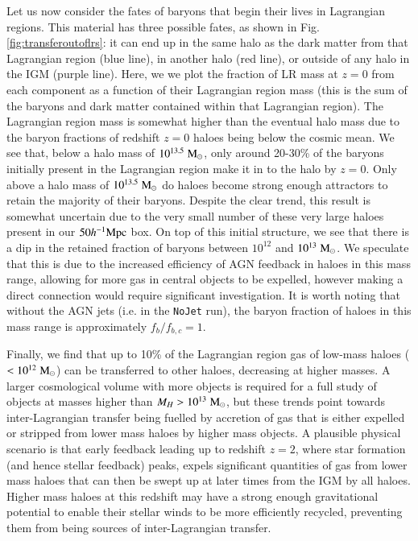 \documentclass[fleqn,usenatbib]{mnras}
\newcommand{\hmpc}{h^{-1}{\rm Mpc}}
\newcommand{\msolar}{\;{\rm M}_{\odot}}
\newcommand{\nojet}{{\tt NoJet}}
\begin{document}
Let us now consider the fates of baryons that begin their lives in Lagrangian
regions. This material has three possible fates, as shown in Fig.
\ref{fig:transferoutoflrs}: it can end up in the same halo as the dark matter
from that Lagrangian region (blue line), in another halo (red line), or
outside of any halo in the IGM (purple line). Here, we we plot the fraction
of LR mass at $z=0$ from each component as a function of their Lagrangian
region mass (this is the sum of the baryons and dark matter contained within
that Lagrangian region). The Lagrangian region mass is somewhat higher than
the eventual halo mass due to the baryon fractions of redshift $z=0$ haloes
being below the cosmic mean. We see that, below a halo mass of
$10^{13.5}\msolar{}$, only around 20-30\% of the baryons initially present in
the Lagrangian region make it in to the halo by $z=0$. Only above a halo mass
of $10^{13.5}\msolar{}$ do haloes become strong enough attractors to retain
the majority of their baryons. Despite the clear trend, this result is
somewhat uncertain due to the very small number of these very large haloes
present in our $50\hmpc{}$ box. On top of this initial structure, we see that
there is a dip in the retained fraction of baryons between $10^{12}$ and
$10^{13}\msolar{}$. We speculate that this is due to the increased efficiency
of AGN feedback in haloes in this mass range, allowing for more gas in
central objects to be expelled, however making a direct connection would
require significant investigation. It is worth noting that without the AGN
jets (i.e. in the \nojet{} run), the baryon fraction of haloes in this mass
range is approximately $f_b / f_{b,c} = 1$.


Finally, we find that up to 10\% of the Lagrangian region gas of low-mass
haloes ($<10^{12} \msolar{}$) can be transferred to other haloes, decreasing at
higher masses. A larger cosmological volume with more objects is required for
a full study of objects at masses higher than $M_H > 10^{13}\msolar{}$, but
these trends point towards inter-Lagrangian transfer being fuelled by
accretion of gas that is either expelled or stripped from lower mass haloes
by higher mass objects. A plausible physical scenario is that early
feedback leading up to redshift $z=2$, where star formation (and hence
stellar feedback) peaks, expels significant quantities of gas from lower mass
haloes that can then be swept up at later times from the IGM by all haloes.
Higher mass haloes at this redshift may have a strong enough gravitational
potential to enable their stellar winds to be more efficiently recycled,
preventing them from being sources of inter-Lagrangian transfer.
\end{document}
